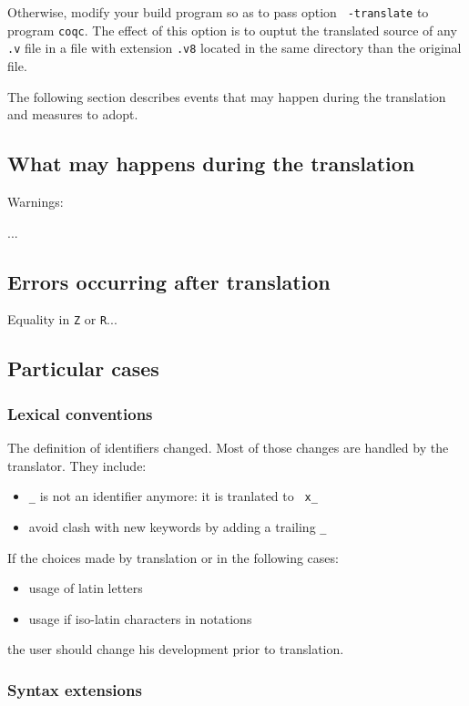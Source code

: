 \documentclass[11pt,a4paper]{article}
\begin{document}
Otherwise, modify your build program so as to pass option {\tt
-translate} to program {\tt coqc}. The effect of this option is to
ouptut the translated source of any {\tt .v} file in a file with
extension {\tt .v8} located in the same directory than the original
file.

The following section describes events that may happen during the
translation and measures to adopt.

\subsection{What may happens during the translation}

Warnings:

...

\subsection{Errors occurring after translation}

Equality in {\tt Z} or {\tt R}...



\subsection{Particular cases}

\subsubsection{Lexical conventions}

The definition of identifiers changed. Most of those changes are
handled by the translator. They include:
\begin{itemize}
\item {\tt \_} is not an identifier anymore: it is tranlated to {\tt
x\_}
\item avoid clash with new keywords by adding a trailing {\tt \_}
\end{itemize}

If the choices made by translation or in the following cases:
\begin{itemize}
\item usage of latin letters
\item usage if iso-latin characters in notations
\end{itemize}
the user should change his development prior to translation.


\subsubsection{Syntax extensions}
\end{document}
